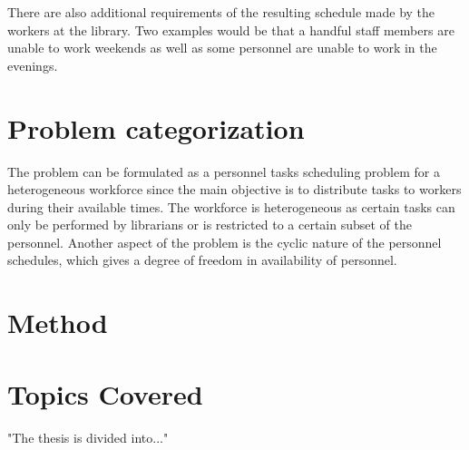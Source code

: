 There are also additional requirements of the resulting schedule made by the workers at the library. Two examples would be that a handful staff members are unable to work weekends as well as some personnel are unable to work in the evenings.

\section{Problem categorization}
The problem can be formulated as a personnel tasks scheduling problem for a heterogeneous workforce since the main objective is to distribute tasks to workers during their available times. The workforce is heterogeneous as certain tasks can only be performed by librarians or is restricted to a certain subset of the personnel. Another aspect of the problem is the cyclic nature of the personnel schedules, which gives a degree of freedom in availability of personnel.

\fi


\section{Method}

\section{Topics Covered}

"The thesis is divided into..."


